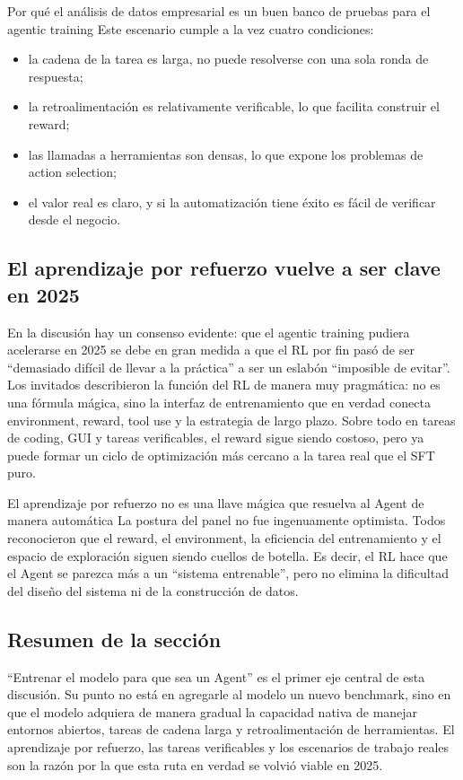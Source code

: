 \begin{knowledgebox}{Por qué el análisis de datos empresarial es un buen banco de pruebas para el agentic training}
Este escenario cumple a la vez cuatro condiciones:
\begin{itemize}
  \item la cadena de la tarea es larga, no puede resolverse con una sola ronda de respuesta;
  \item la retroalimentación es relativamente verificable, lo que facilita construir el reward;
  \item las llamadas a herramientas son densas, lo que expone los problemas de action selection;
  \item el valor real es claro, y si la automatización tiene éxito es fácil de verificar desde el negocio.
\end{itemize}
\end{knowledgebox}

\subsection{El aprendizaje por refuerzo vuelve a ser clave en 2025}

En la discusión hay un consenso evidente: que el agentic training pudiera acelerarse en 2025 se debe en gran medida a que el RL por fin pasó de ser ``demasiado difícil de llevar a la práctica'' a ser un eslabón ``imposible de evitar''. Los invitados describieron la función del RL de manera muy pragmática: no es una fórmula mágica, sino la interfaz de entrenamiento que en verdad conecta environment, reward, tool use y la estrategia de largo plazo. Sobre todo en tareas de coding, GUI y tareas verificables, el reward sigue siendo costoso, pero ya puede formar un ciclo de optimización más cercano a la tarea real que el SFT puro.

\begin{warningbox}{El aprendizaje por refuerzo no es una llave mágica que resuelva al Agent de manera automática}
La postura del panel no fue ingenuamente optimista. Todos reconocieron que el reward, el environment, la eficiencia del entrenamiento y el espacio de exploración siguen siendo cuellos de botella. Es decir, el RL hace que el Agent se parezca más a un ``sistema entrenable'', pero no elimina la dificultad del diseño del sistema ni de la construcción de datos.
\end{warningbox}

\subsection{Resumen de la sección}

``Entrenar el modelo para que sea un Agent'' es el primer eje central de esta discusión. Su punto no está en agregarle al modelo un nuevo benchmark, sino en que el modelo adquiera de manera gradual la capacidad nativa de manejar entornos abiertos, tareas de cadena larga y retroalimentación de herramientas. El aprendizaje por refuerzo, las tareas verificables y los escenarios de trabajo reales son la razón por la que esta ruta en verdad se volvió viable en 2025.
